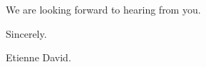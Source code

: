 \documentclass[1p]{elsarticle}
\begin{document}
\medskip


We are looking forward to hearing from you.

\medskip

\indent Sincerely.

\medskip

Etienne David.
\end{document}
